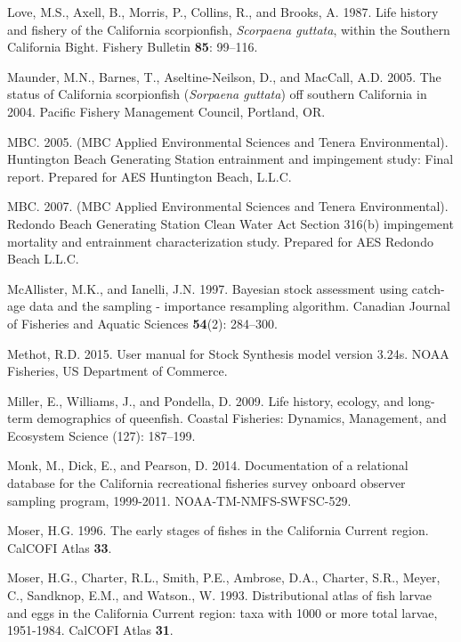 \documentclass[12pt,]{article}
\begin{document}
\hypertarget{ref-Love1987}{}
Love, M.S., Axell, B., Morris, P., Collins, R., and Brooks, A. 1987.
Life history and fishery of the California scorpionfish, \emph{Scorpaena
guttata}, within the Southern California Bight. Fishery Bulletin
\textbf{85}: 99--116.

\hypertarget{ref-Maunder2005}{}
Maunder, M.N., Barnes, T., Aseltine-Neilson, D., and MacCall, A.D. 2005.
The status of California scorpionfish (\emph{Sorpaena guttata}) off
southern California in 2004. Pacific Fishery Management Council,
Portland, OR.

\hypertarget{ref-MBC2005}{}
MBC. 2005. (MBC Applied Environmental Sciences and Tenera
Environmental). Huntington Beach Generating Station entrainment and
impingement study: Final report. Prepared for AES Huntington Beach,
L.L.C.

\hypertarget{ref-MBC2007}{}
MBC. 2007. (MBC Applied Environmental Sciences and Tenera
Environmental). Redondo Beach Generating Station Clean Water Act Section
316(b) impingement mortality and entrainment characterization study.
Prepared for AES Redondo Beach L.L.C.

\hypertarget{ref-McAllister1997}{}
McAllister, M.K., and Ianelli, J.N. 1997. Bayesian stock assessment
using catch-age data and the sampling - importance resampling algorithm.
Canadian Journal of Fisheries and Aquatic Sciences \textbf{54}(2):
284--300.

\hypertarget{ref-Methot2015}{}
Methot, R.D. 2015. User manual for Stock Synthesis model version 3.24s.
NOAA Fisheries, US Department of Commerce.

\hypertarget{ref-Miller2009}{}
Miller, E., Williams, J., and Pondella, D. 2009. Life history, ecology,
and long-term demographics of queenfish. Coastal Fisheries: Dynamics,
Management, and Ecosystem Science (127): 187--199.

\hypertarget{ref-Monk2014}{}
Monk, M., Dick, E., and Pearson, D. 2014. Documentation of a relational
database for the California recreational fisheries survey onboard
observer sampling program, 1999-2011. NOAA-TM-NMFS-SWFSC-529.

\hypertarget{ref-Moser1996}{}
Moser, H.G. 1996. The early stages of fishes in the California Current
region. CalCOFI Atlas \textbf{33}.

\hypertarget{ref-Moser1993}{}
Moser, H.G., Charter, R.L., Smith, P.E., Ambrose, D.A., Charter, S.R.,
Meyer, C., Sandknop, E.M., and Watson., W. 1993. Distributional atlas of
fish larvae and eggs in the California Current region: taxa with 1000 or
more total larvae, 1951-1984. CalCOFI Atlas \textbf{31}.
\end{document}
